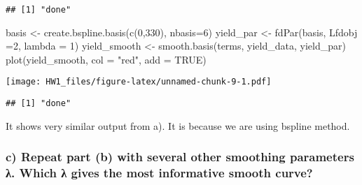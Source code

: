 \documentclass[
]{article}
\newenvironment{Shaded}{\begin{snugshade}}{\end{snugshade}}
\newcommand{\AttributeTok}[1]{\textcolor[rgb]{0.77,0.63,0.00}{#1}}
\newcommand{\ConstantTok}[1]{\textcolor[rgb]{0.00,0.00,0.00}{#1}}
\newcommand{\DecValTok}[1]{\textcolor[rgb]{0.00,0.00,0.81}{#1}}
\newcommand{\FunctionTok}[1]{\textcolor[rgb]{0.00,0.00,0.00}{#1}}
\newcommand{\NormalTok}[1]{#1}
\newcommand{\OtherTok}[1]{\textcolor[rgb]{0.56,0.35,0.01}{#1}}
\newcommand{\SpecialCharTok}[1]{\textcolor[rgb]{0.00,0.00,0.00}{#1}}
\newcommand{\StringTok}[1]{\textcolor[rgb]{0.31,0.60,0.02}{#1}}
\begin{document}
\begin{verbatim}
## [1] "done"
\end{verbatim}

\begin{Shaded}
\begin{Highlighting}[]
\NormalTok{basis }\OtherTok{\textless{}{-}} \FunctionTok{create.bspline.basis}\NormalTok{(}\FunctionTok{c}\NormalTok{(}\DecValTok{0}\NormalTok{,}\DecValTok{330}\NormalTok{), }\AttributeTok{nbasis=}\DecValTok{6}\NormalTok{)}
\NormalTok{yield\_par }\OtherTok{\textless{}{-}} \FunctionTok{fdPar}\NormalTok{(basis, }\AttributeTok{Lfdobj =}\DecValTok{2}\NormalTok{, }\AttributeTok{lambda =} \DecValTok{1}\NormalTok{)}
\NormalTok{yield\_smooth }\OtherTok{\textless{}{-}} \FunctionTok{smooth.basis}\NormalTok{(terms, yield\_data, yield\_par)}
\FunctionTok{plot}\NormalTok{(yield\_smooth, }\AttributeTok{col =} \StringTok{"red"}\NormalTok{, }\AttributeTok{add =} \ConstantTok{TRUE}\NormalTok{)}
\end{Highlighting}
\end{Shaded}

\texttt{[image: HW1\_files/figure-latex/unnamed-chunk-9-1.pdf]}

\begin{verbatim}
## [1] "done"
\end{verbatim}

It shows very similar output from a). It is because we are using bspline
method.

\hypertarget{c-repeat-part-b-with-several-other-smoothing-parameters-ux3bb.-which-ux3bb-gives-the-most-informative-smooth-curve}{%
\subsubsection{c) Repeat part (b) with several other smoothing
parameters λ. Which λ gives the most informative smooth
curve?}\label{c-repeat-part-b-with-several-other-smoothing-parameters-ux3bb.-which-ux3bb-gives-the-most-informative-smooth-curve}}

\begin{Shaded}
\end{Shaded}
\end{document}
